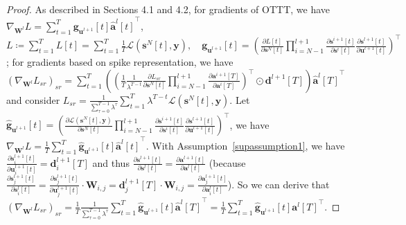 \documentclass{article}
\begin{document}
\begin{proof}

As described in Sections 4.1 and 4.2, for gradients of OTTT, we have $\nabla_{\mathbf{W}^l}L=\sum_{t=1}^T\mathbf{g}_{\mathbf{u}^{l+1}}[t]{\hat{\mathbf{a}}^l[t]}^\top$, $L\coloneqq\sum_{t=1}^TL[t]=\sum_{t=1}^T\frac{1}{T}\mathcal{L}\left(\mathbf{s}^N[t], \mathbf{y}\right),\quad \mathbf{g}_{\mathbf{u}^{l+1}}[t]=\left(\frac{\partial L[t]}{\partial \mathbf{s}^N[t]}\prod_{i=N-1}^{l+1}\frac{\partial \mathbf{s}^{i+1}[t]}{\partial \mathbf{s}^i[t]} \frac{\partial \mathbf{s}^{l+1}[t]}{\partial \mathbf{u}^{l+1}[t]}\right)^\top$; for gradients based on spike representation, we have $\left(\nabla_{\mathbf{W}^l}L_{sr}\right)_{sr} = \sum_{t=1}^T\left(\left(\frac{1}{T}\frac{1}{\lambda^{T-t}}\frac{\partial L_{sr}}{\partial \mathbf{s}^N[t]}\prod_{i=N-1}^{l+1}\frac{\partial \mathbf{a}^{i+1}[T]}{\partial \mathbf{a}^i[T]}\right)^\top\odot \mathbf{d}^{l+1}[T]\right){\hat{\mathbf{a}}^l[T]}^\top$ and consider $L_{sr}=\frac{1}{\sum_{\tau=0}^{T-1}\lambda^\tau}\sum_{t=1}^T\lambda^{T-t}\mathcal{L}(\mathbf{s}^N[t], \mathbf{y})$. Let $\hat{\mathbf{g}}_{\mathbf{u}^{l+1}}[t]=\left(\frac{\partial \mathcal{L}(\mathbf{s}^N[t], \mathbf{y})}{\partial \mathbf{s}^N[t]}\prod_{i=N-1}^{l+1}\frac{\partial \mathbf{s}^{i+1}[t]}{\partial \mathbf{s}^i[t]} \frac{\partial \mathbf{s}^{l+1}[t]}{\partial \mathbf{u}^{l+1}[t]}\right)^\top$, we have $\nabla_{\mathbf{W}^l}L = \frac{1}{T} \sum_{t=1}^T \hat{\mathbf{g}}_{\mathbf{u}^{l+1}}[t] {\hat{\mathbf{a}}^l[t]}^\top$. With Assumption~\ref{supassumption1}, we have $\frac{\partial \mathbf{s}^{l+1}_i[t]}{\partial \mathbf{u}^{l+1}_i[t]}=\mathbf{d}^{l+1}_i[T]$ and thus $\frac{\partial \mathbf{s}^{l+1}[t]}{\partial \mathbf{s}^{l}[t]}=\frac{\partial \mathbf{a}^{l+1}[t]}{\partial \mathbf{a}^{l}[t]}$ (because $\frac{\partial \mathbf{s}^{l+1}_j[t]}{\partial \mathbf{s}^{l}_i[t]}=\frac{\partial \mathbf{s}^{l+1}_j[t]}{\partial \mathbf{u}^{l+1}_j[t]}\cdot\mathbf{W}_{i,j}=\mathbf{d}^{l+1}_j[T]\cdot\mathbf{W}_{i,j}=\frac{\partial \mathbf{a}^{l+1}_j[t]}{\partial \mathbf{a}^{l}_i[t]}$). So we can derive that $\left(\nabla_{\mathbf{W}^l}L_{sr}\right)_{sr}=\frac{1}{T}\frac{1}{\sum_{\tau=0}^{T-1}\lambda^\tau}\sum_{t=1}^T\hat{\mathbf{g}}_{\mathbf{u}^{l+1}}[t] {\hat{\mathbf{a}}^l[T]}^\top=\frac{1}{T}\sum_{t=1}^T\hat{\mathbf{g}}_{\mathbf{u}^{l+1}}[t] {\mathbf{a}^l[T]}^\top$.


\end{proof}
\end{document}

